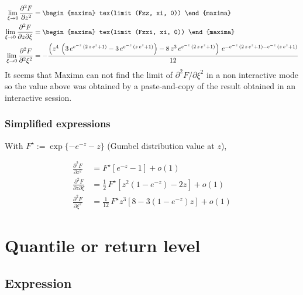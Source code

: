 \begin{align*}
  \lim_{\xi \to 0} \frac{\partial^2 F}{\partial z^2}
  &=
    \begin{maxima}
      tex(limit (Fzz, xi, 0))
    \end{maxima}
  \\
  \lim_{\xi \to 0} \frac{\partial^2 F}{\partial z \partial \xi}
  &=
    \begin{maxima}
      tex(limit (Fzxi, xi, 0))
    \end{maxima}
  \\
  \lim_{\xi \to 0} \frac{\partial^2 F}{\partial^2 \xi^2}
  &= -{{\left(z^4\,\left(3\,e^{e^ {- z }\,\left(2\,z\,e^{z}+1\right)}-3
 \,e^{e^ {- z }\,\left(z\,e^{z}+1\right)}\right)-8\,z^3\,e^{e^ {- z }
 \,\left(2\,z\,e^{z}+1\right)}\right)\,e^{-e^ {- z }\,\left(2\,z\,e^{
 z}+1\right)-e^ {- z }\,\left(z\,e^{z}+1\right)}}\over{12}}
\end{align*}
It seems that Maxima can not find the limit of
$\partial^2 F/\partial \xi^2$ in a non interactive mode so the value
above was obtained by a paste-and-copy of the result obtained in an
interactive session.

\subsubsection*{Simplified expressions}

With $F^\star := \exp\{-e^{-z} - z\}$ (Gumbel distribution value at $z$), 

{\color{red}
\begin{align*}
  \frac{\partial^2 F}{\partial z^2} 
  &= F^\star \left[ e^{-z} - 1  \right] + o(1) \\
  \frac{\partial^2 F}{\partial z \partial \xi}
  &= \frac{1}{2} \, F^\star \left[ z^2 \left(1 - e^{-z} \right) - 2 z  \right] +
  o(1)\\
  \frac{\partial^2 F}{\partial \xi^2}
  &= \frac{1}{12} \, F^\star z^3 \left[ 8 - 3 \left(1 - e^{-z}\right) z \right]+ o(1)
\end{align*}
}


\section{Quantile or return level}

\subsection{Expression}

